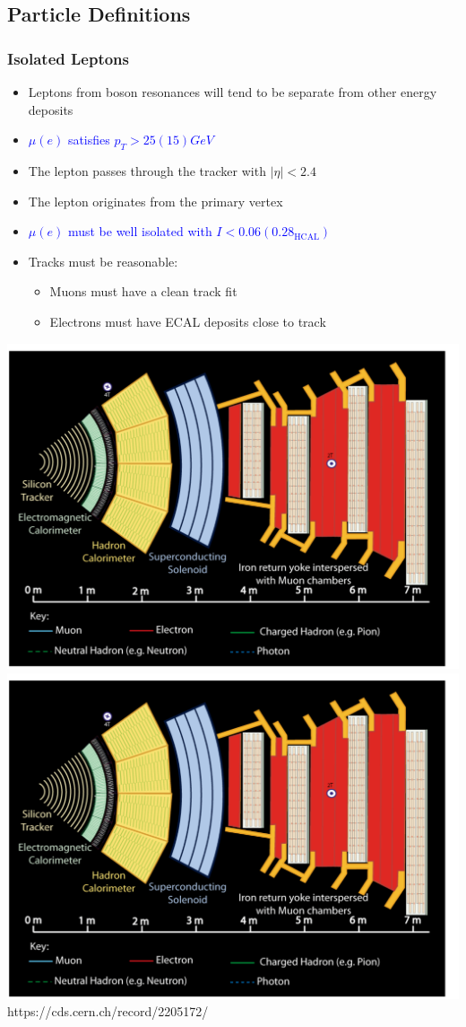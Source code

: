 \documentclass{beamer}
\begin{document}
\subsection{Particle Definitions}

\begin{frame}
  \frametitle{Isolated Leptons}

  \begin{itemize}
  \item Leptons from boson resonances will tend to be separate from other energy deposits
  \item \textcolor{blue}{$\mu (e)$ satisfies $p_T > 25 (15) \si{GeV}$}
  \item The lepton passes through the tracker with $|\eta| < 2.4$
  \item The lepton originates from the primary vertex
  \item \textcolor{blue}{$\mu (e)$ must be well isolated with $I < 0.06(0.28_\mathrm{HCAL})$}
  \item Tracks must be reasonable:
    \begin{itemize}
    \item Muons must have a clean track fit
    \item Electrons must have ECAL deposits close to track
    \end{itemize}
  \end{itemize}

  \centering
  \includegraphics[width=0.4\linewidth,page=2]{figures/cms_interactive.pdf}
  \includegraphics[width=0.4\linewidth,page=3]{figures/cms_interactive.pdf}
  \\
  \tiny{https://cds.cern.ch/record/2205172/}

\end{frame}
\end{document}
